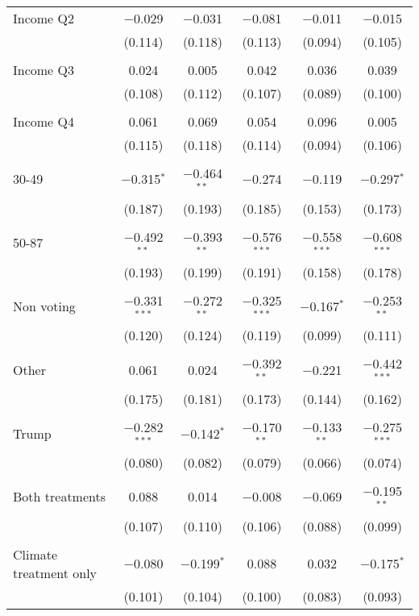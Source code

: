 \begin{tabular}{@{\extracolsep{5pt}}lccccc}
 Income Q2 & $-$0.029 & $-$0.031 & $-$0.081 & $-$0.011 & $-$0.015 \\ 
  & (0.114) & (0.118) & (0.113) & (0.094) & (0.105) \\ 
  & & & & & \\ 
 Income Q3 & 0.024 & 0.005 & 0.042 & 0.036 & 0.039 \\ 
  & (0.108) & (0.112) & (0.107) & (0.089) & (0.100) \\ 
  & & & & & \\ 
 Income Q4 & 0.061 & 0.069 & 0.054 & 0.096 & 0.005 \\ 
  & (0.115) & (0.118) & (0.114) & (0.094) & (0.106) \\ 
  & & & & & \\ 
 30-49 & $-$0.315$^{*}$ & $-$0.464$^{**}$ & $-$0.274 & $-$0.119 & $-$0.297$^{*}$ \\ 
  & (0.187) & (0.193) & (0.185) & (0.153) & (0.173) \\ 
  & & & & & \\ 
 50-87 & $-$0.492$^{**}$ & $-$0.393$^{**}$ & $-$0.576$^{***}$ & $-$0.558$^{***}$ & $-$0.608$^{***}$ \\ 
  & (0.193) & (0.199) & (0.191) & (0.158) & (0.178) \\ 
  & & & & & \\ 
 Non voting & $-$0.331$^{***}$ & $-$0.272$^{**}$ & $-$0.325$^{***}$ & $-$0.167$^{*}$ & $-$0.253$^{**}$ \\ 
  & (0.120) & (0.124) & (0.119) & (0.099) & (0.111) \\ 
  & & & & & \\ 
 Other & 0.061 & 0.024 & $-$0.392$^{**}$ & $-$0.221 & $-$0.442$^{***}$ \\ 
  & (0.175) & (0.181) & (0.173) & (0.144) & (0.162) \\ 
  & & & & & \\ 
 Trump & $-$0.282$^{***}$ & $-$0.142$^{*}$ & $-$0.170$^{**}$ & $-$0.133$^{**}$ & $-$0.275$^{***}$ \\ 
  & (0.080) & (0.082) & (0.079) & (0.066) & (0.074) \\ 
  & & & & & \\ 
 Both treatments & 0.088 & 0.014 & $-$0.008 & $-$0.069 & $-$0.195$^{**}$ \\ 
  & (0.107) & (0.110) & (0.106) & (0.088) & (0.099) \\ 
  & & & & & \\ 
 Climate treatment only & $-$0.080 & $-$0.199$^{*}$ & 0.088 & 0.032 & $-$0.175$^{*}$ \\ 
  & (0.101) & (0.104) & (0.100) & (0.083) & (0.093) \\ 

\end{tabular}
